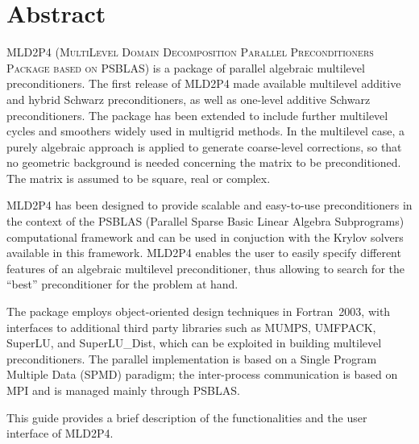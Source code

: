 \section*{Abstract}

\textsc{MLD2P4 (MultiLevel Domain Decomposition Parallel Preconditioners Package
based on PSBLAS}) is a package of parallel algebraic multilevel preconditioners.
The first release of MLD2P4 made available multilevel additive and hybrid Schwarz
preconditioners, as well as one-level additive Schwarz preconditioners. The package
has been extended to include further multilevel cycles and smoothers widely used in
multigrid methods. In the multilevel case, a purely algebraic approach is applied to
generate coarse-level corrections, so that no geometric background is needed
concerning the matrix to be preconditioned. The matrix is assumed to be square,
real or complex. 

MLD2P4 has been designed to provide scalable and easy-to-use preconditioners
in the context of the PSBLAS (Parallel Sparse Basic Linear Algebra Subprograms)
computational framework and can be used in conjuction with the Krylov solvers
available in this framework. MLD2P4 enables the user to easily specify different
features of an algebraic multilevel preconditioner, thus allowing to search
for the ``best'' preconditioner for the problem at hand. 

The package employs object-oriented design techniques in
Fortran~2003, with interfaces to additional third party libraries 
such as MUMPS, UMFPACK, SuperLU, and SuperLU\_Dist, which
can be exploited in building multilevel preconditioners. The parallel
implementation is based on a Single Program Multiple Data (SPMD)
paradigm; the inter-process communication is based on MPI and
is managed mainly through PSBLAS.

This guide provides a brief description of the functionalities and
the user interface of MLD2P4.
